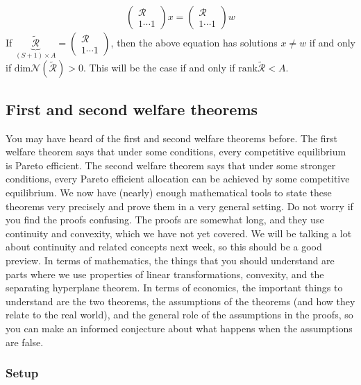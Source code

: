 \documentclass[12pt,reqno]{amsart}
\theoremstyle{definition}
\newcommand{\rank}{\mathrm{rank}}
\renewcommand{\dim}{\mathrm{dim}}
\begin{document}
\begin{align*}
  \begin{pmatrix} \mathcal{R} \\ 1 \cdots 1 \end{pmatrix} x 
  = \begin{pmatrix} \mathcal{R} \\ 1 \cdots 1 \end{pmatrix} w 
\end{align*}
If $\underbrace{\widetilde{\mathcal{R}}}_{(S+1) \times A}
=   \begin{pmatrix} \mathcal{R} \\ 1 \cdots  1 \end{pmatrix} $, then
the above equation has solutions $x \neq w$ 
if and only if $\dim \mathcal{N}(\widetilde{\mathcal{R}})> 0$. This will
be the case if and only if $\rank \widetilde{\mathcal{R}} < A$. 

\subsection{First and second welfare theorems \label{sec:welfare}}

You may have heard of the first and second welfare theorems
before. The first welfare theorem says that under some conditions,
every competitive equilibrium is Pareto efficient. The second welfare
theorem says that under some stronger conditions, every Pareto
efficient allocation can be achieved by some competitive
equilibrium. We now have (nearly) enough mathematical tools to state
these theorems very precisely and prove them in a very general
setting.  Do not worry if you find the proofs confusing. The proofs
are somewhat long, and they use continuity and convexity, which we
have not yet covered. We will be talking a lot about continuity and
related concepts next week, so this should be a good preview. In terms
of mathematics, the things that you should understand are parts where
we use properties of linear transformations, convexity, and the
separating hyperplane theorem. In terms of economics, the important
things to understand are the two theorems, the assumptions of the
theorems (and how they relate to the real world), and the general role
of the assumptions in the proofs, so you can make an informed
conjecture about what happens when the assumptions are false.

\subsubsection{Setup}
\end{document}
